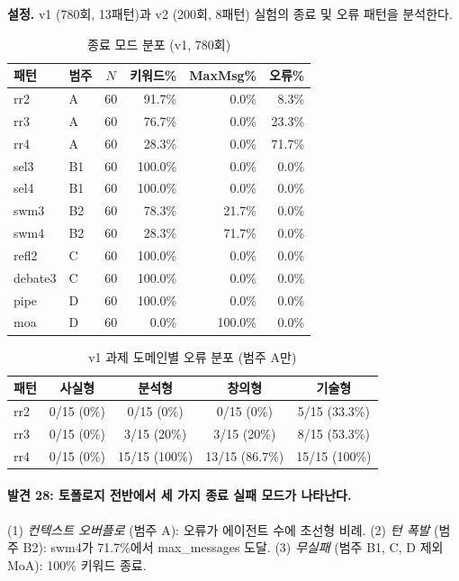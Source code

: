\documentclass[a4paper,11pt]{article}
\begin{document}
\textbf{설정.} v1 (780회, 13패턴)과 v2 (200회, 8패턴) 실험의 종료 및 오류 패턴을 분석한다.

\begin{table}[H]
\centering
\caption{종료 모드 분포 (v1, 780회)}
\label{tab:termination-modes}
{\small
\begin{tabular}{llcrrr}
\toprule
패턴 & 범주 & $N$ & 키워드\% & MaxMsg\% & 오류\% \\
\midrule
rr2     & A  & 60 & 91.7\%  & 0.0\%   & 8.3\% \\
rr3     & A  & 60 & 76.7\%  & 0.0\%   & 23.3\% \\
rr4     & A  & 60 & 28.3\%  & 0.0\%   & 71.7\% \\
sel3    & B1 & 60 & 100.0\% & 0.0\%   & 0.0\% \\
sel4    & B1 & 60 & 100.0\% & 0.0\%   & 0.0\% \\
swm3    & B2 & 60 & 78.3\%  & 21.7\%  & 0.0\% \\
swm4    & B2 & 60 & 28.3\%  & 71.7\%  & 0.0\% \\
refl2   & C  & 60 & 100.0\% & 0.0\%   & 0.0\% \\
debate3 & C  & 60 & 100.0\% & 0.0\%   & 0.0\% \\
pipe    & D  & 60 & 100.0\% & 0.0\%   & 0.0\% \\
moa     & D  & 60 & 0.0\%   & 100.0\% & 0.0\% \\
\bottomrule
\end{tabular}
}
\end{table}

\begin{table}[H]
\centering
\caption{v1 과제 도메인별 오류 분포 (범주 A만)}
\label{tab:error-by-domain}
{\small
\begin{tabular}{lcccc}
\toprule
패턴 & 사실형 & 분석형 & 창의형 & 기술형 \\
\midrule
rr2 & 0/15 (0\%) & 0/15 (0\%) & 0/15 (0\%) & 5/15 (33.3\%) \\
rr3 & 0/15 (0\%) & 3/15 (20\%) & 3/15 (20\%) & 8/15 (53.3\%) \\
rr4 & 0/15 (0\%) & 15/15 (100\%) & 13/15 (86.7\%) & 15/15 (100\%) \\
\bottomrule
\end{tabular}
}
\end{table}

\paragraph{발견 28: 토폴로지 전반에서 세 가지 종료 실패 모드가 나타난다.}
(1) \emph{컨텍스트 오버플로} (범주 A): 오류가 에이전트 수에 초선형 비례. (2) \emph{턴 폭발} (범주 B2): swm4가 71.7\%에서 max\_messages 도달. (3) \emph{무실패} (범주 B1, C, D 제외 MoA): 100\% 키워드 종료.
\end{document}
